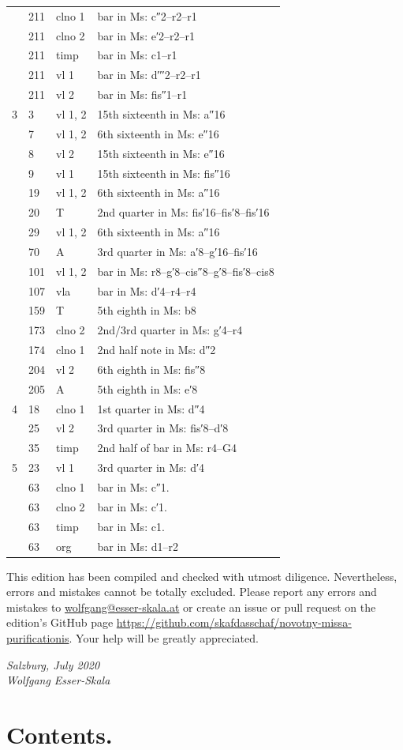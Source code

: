 \documentclass[parskip=full]{scrreprt}
\newif\iftemplate\templatetrue
\begin{document}
\begin{longtable}{lll L{10cm}}
	  & 211 & clno 1  & bar in Ms: c″2–r2–r1 \\
	  & 211 & clno 2  & bar in Ms: e′2–r2–r1 \\
	  & 211 & timp    & bar in Ms: c1–r1 \\
	  & 211 & vl 1    & bar in Ms: d′′′2–r2–r1 \\
	  & 211 & vl 2    & bar in Ms: fis″1–r1 \\
	3 & 3   & vl 1, 2 & 15th sixteenth in Ms: a″16 \\
	  & 7   & vl 1, 2 & 6th sixteenth in Ms: e″16 \\
	  & 8   & vl 2    & 15th sixteenth in Ms: e″16 \\
	  & 9   & vl 1    & 15th sixteenth in Ms: fis″16 \\
	  & 19  & vl 1, 2 & 6th sixteenth in Ms: a″16 \\
	  & 20  & T       & 2nd quarter in Ms: fis′16–fis′8–fis′16 \\
	  & 29  & vl 1, 2 & 6th sixteenth in Ms: a″16 \\
	  & 70  & A       & 3rd quarter in Ms: a′8–g′16–fis′16 \\
	  & 101 & vl 1, 2 & bar in Ms: r8–g′8–cis″8–g′8–fis′8–cis8 \\
	  & 107 & vla     & bar in Ms: d′4–r4–r4 \\
	  & 159 & T       & 5th eighth in Ms: b8 \\
	  & 173 & clno 2  & 2nd/3rd quarter in Ms: g′4–r4 \\
	  & 174 & clno 1  & 2nd half note in Ms: d″2 \\
	  & 204 & vl 2    & 6th eighth in Ms: fis″8 \\
	  & 205 & A       & 5th eighth in Ms: e′8 \\
	4 & 18  & clno 1  & 1st quarter in Ms: d″4 \\
	  & 25  & vl 2    & 3rd quarter in Ms: fis′8–d′8 \\
	  & 35  & timp    & 2nd half of bar in Ms: r4–G4 \\
	5 & 23  & vl 1    & 3rd quarter in Ms: d′4 \\
	  & 63  & clno 1  & bar in Ms: c″1. \\
	  & 63  & clno 2  & bar in Ms: c′1. \\
	  & 63  & timp    & bar in Ms: c1. \\
	  & 63  & org     & bar in Ms: d1–r2 \\
	\bottomrule
\end{longtable}


This edition has been compiled and checked with utmost diligence. Nevertheless, errors and mistakes cannot be totally excluded. Please report any errors and mistakes to \url{wolfgang@esser-skala.at} or create an issue or pull request on the edition’s GitHub page \url{https://github.com/skafdasschaf/novotny-missa-purificationis}. Your help will be greatly appreciated.

\bigskip
\textit{Salzburg, July 2020\\
Wolfgang Esser-Skala}

\cleardoublepage
\chapter*{Contents.}


\cleardoublepage
\fi

\iftemplate

\fi
\end{document}
